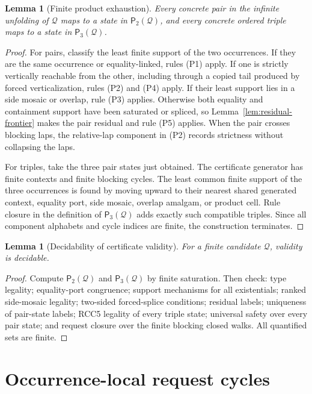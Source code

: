 \documentclass[11pt]{article}
\newtheorem{lemma}[theorem]{Lemma}
\newcommand{\Q}{\mathcal Q}
\newcommand{\Pairs}{\mathsf{P}_2}
\newcommand{\Triples}{\mathsf{P}_3}
\begin{document}
\begin{lemma}[Finite product exhaustion]
\label{lem:product-exhaustion}
Every concrete pair in the infinite unfolding of $\Q$ maps to a state in $\Pairs(\Q)$, and every concrete ordered triple maps to a state in $\Triples(\Q)$.
\end{lemma}

\begin{proof}
For pairs, classify the least finite support of the two occurrences.  If they are the same occurrence or equality-linked, rules (P1) apply.  If one is strictly vertically reachable from the other, including through a copied tail produced by forced verticalization, rules (P2) and (P4) apply.  If their least support lies in a side mosaic or overlap, rule (P3) applies.  Otherwise both equality and containment support have been saturated or spliced, so Lemma~\ref{lem:residual-frontier} makes the pair residual and rule (P5) applies.  When the pair crosses blocking laps, the relative-lap component in (P2) records strictness without collapsing the laps.

For triples, take the three pair states just obtained.  The certificate generator has finite contexts and finite blocking cycles.  The least common finite support of the three occurrences is found by moving upward to their nearest shared generated context, equality port, side mosaic, overlap amalgam, or product cell.  Rule closure in the definition of $\Triples(\Q)$ adds exactly such compatible triples.  Since all component alphabets and cycle indices are finite, the construction terminates.
\end{proof}

\begin{lemma}[Decidability of certificate validity]
\label{lem:validity-decidable}
For a finite candidate $\Q$, validity is decidable.
\end{lemma}

\begin{proof}
Compute $\Pairs(\Q)$ and $\Triples(\Q)$ by finite saturation.  Then check: type legality; equality-port congruence; support mechanisms for all existentials; ranked side-mosaic legality; two-sided forced-splice conditions; residual labels; uniqueness of pair-state labels; RCC5 legality of every triple state; universal safety over every pair state; and request closure over the finite blocking closed walks.  All quantified sets are finite.
\end{proof}

\section{Occurrence-local request cycles}
\end{document}
